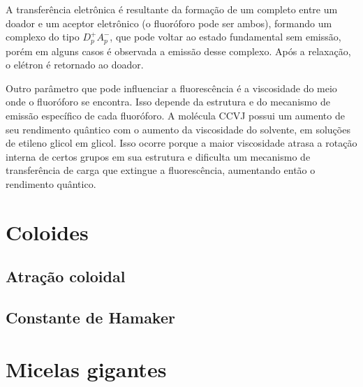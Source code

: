 		A transferência eletrônica é resultante da formação de um completo entre um doador e um aceptor eletrônico (o fluoróforo pode ser ambos), formando um complexo do tipo \(D_p^+A_p^-\), que pode voltar ao estado fundamental sem emissão, porém em alguns casos é observada a emissão desse complexo. Após a relaxação, o elétron é retornado ao doador. 
		
		Outro parâmetro que pode influenciar a fluorescência é a viscosidade do meio onde o fluoróforo se encontra. Isso depende da estrutura e do mecanismo de emissão específico de cada fluoróforo. A molécula CCVJ possui um aumento de seu rendimento quântico com o aumento da viscosidade do solvente, em soluções de etileno glicol em glicol. Isso ocorre porque a maior viscosidade atrasa a rotação interna de certos grupos em sua estrutura e dificulta um mecanismo de transferência de carga que extingue a fluorescência, aumentando então o rendimento quântico.
		
		
		
	\chapter{Coloides}
		\section{Atração coloidal}
		\section{Constante de Hamaker}
	\chapter{Micelas gigantes}
		\label{chap:micelas_gigantes}
